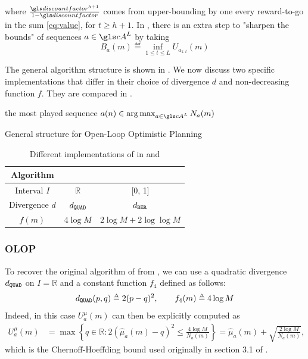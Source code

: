 \noindent
where $\frac{\discount^{h+1}}{1-\discount}$ comes from upper-bounding by one every reward-to-go in the sum \eqref{eq:value}, for $t\geq h+1$. In \citep{Bubeck2010}, there is an extra step to "sharpen the bounds" of sequences $a \in \cA^L$ by taking
\begin{equation}
\label{eq:Ba}
B_a(m) \eqdef \inf_{1 \leq t \leq L} U_{a_{1:t}}(m)
\end{equation}


The general algorithm structure is shown in .
We now discuss two specific implementations that differ in their choice of divergence $d$ and non-decreasing function $f$. They are compared in .

\begin{algorithm}[tp]
	\DontPrintSemicolon
	\Return the most played sequence $a(n) \in \argmax_{a\in \cA^L} N_a(m)$
	\caption{General structure for Open-Loop Optimistic Planning}
	\label{alg:kl-olop}
\end{algorithm}

\begin{table}[tp]
	\caption{Different implementations of  in \OLOP and \KLOLOP}
	\label{tab:comparison}
	\centering
	\begin{tabular}{ccc}
		\toprule
		Algorithm & \OLOP & \KLOLOP \\
		\midrule
		Interval $I$ & $\mathbb{R}$ & [0, 1] \\
		Divergence $d$ & $d_\texttt{QUAD}$ & $d_\texttt{BER}$ \\
		$f(m)$ & $4 \log M$ & $2\log M + 2 \log\log M$\\
		\bottomrule
	\end{tabular}
\end{table}

\subsubsection{\gls*{OLOP}}
\label{sec:kl-olop-olop}
To recover the original \OLOP algorithm of \citet{Bubeck2010} from , we can use a quadratic divergence $d_\texttt{QUAD}$ on $I=\mathbb{R}$ and a constant function $f_4$ defined as follows:
\begin{equation*}
\dquad(p,q) \eqdef 2(p-q)^2,\qquad
f_4(m) \eqdef 4 \log M
\end{equation*}
Indeed, in this case $U^{\mu}_a(m)$ can then be explicitly computed as
\begin{align*}
U^{\mu}_a(m) &= \max \left\{q\in \mathbb{R}: 2(\hat{\mu}_a(m) - q)^2 \leq \frac{4 \log M }{N_a(m)} \right\} = \hat{\mu}_a(m) + \sqrt{\frac{2 \log M}{N_a(m)}},
\end{align*}
which is the Chernoff-Hoeffding bound used originally in section 3.1 of \citep{Bubeck2010}.

